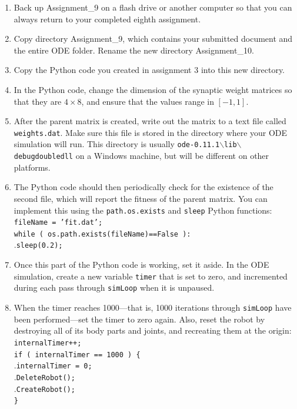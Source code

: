\documentclass[12pt]{article}
\begin{document}
\begin{enumerate}

\item Back up Assignment\_9 on a flash drive or another computer so that you can always return to your completed eighth assignment.

\item Copy directory Assignment\_9, which contains your submitted document and the entire ODE folder. Rename the new directory Assignment\_10.

\item Copy the Python code you created in assignment 3 into this new directory.

\item In the Python code, change the dimension of the synaptic weight matrices so that they are $4 \times 8$, and ensure that the values range in $[-1,1]$.

\item After the parent matrix is created, write out the matrix to a text file called \texttt{weights.dat}. Make sure this file is stored in the directory where your ODE simulation will run. This directory is usually \texttt{ode-0.11.1$\backslash$lib$\backslash$debugdoubledll} on a Windows machine, but will be different on other platforms.

\item The Python code should then periodically check for the existence of the second file, which will report the fitness of the parent matrix. You can implement this using the \texttt{path.os.exists} and \texttt{sleep} Python functions: \\
   \texttt{fileName = 'fit.dat';}\\
   \texttt{while ( os.path.exists(fileName)==False ):}\\
.\hspace{0.5cm}\texttt{\hspace{0.5cm}sleep(0.2);}\\

 \item Once this part of the Python code is working, set it aside. In the ODE simulation, create a new variable \texttt{timer} that is set to zero, and incremented during each pass through \texttt{simLoop} when it is unpaused.

 \item When the timer reaches 1000---that is, 1000 iterations through \texttt{simLoop} have been performed---set the timer to zero again. Also, reset the robot by destroying all of its body parts and joints, and recreating them at the origin: \\
   \texttt{internalTimer++;}\\
   \texttt{if ( internalTimer == 1000 ) \{}\\
.\hspace{0.5cm}\texttt{internalTimer = 0;}\\
.\hspace{0.5cm}\texttt{DeleteRobot();}\\
.\hspace{0.5cm}\texttt{CreateRobot();}\\
   \texttt{\}}\\


\end{enumerate}
\end{document}
